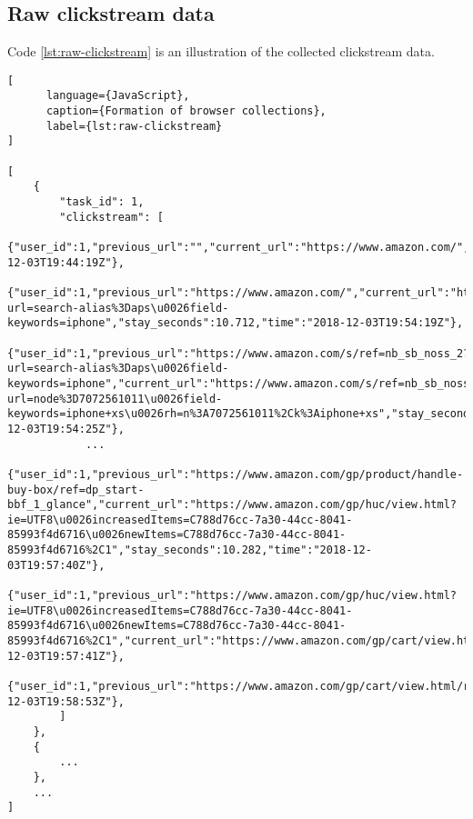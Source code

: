 \subsection{Raw clickstream data}

Code \ref{lst:raw-clickstream} is an illustration of the collected clickstream data.

\begin{lstlisting}[
      language={JavaScript},
      caption={Formation of browser collections},
      label={lst:raw-clickstream}
]

[
    {
        "task_id": 1,
        "clickstream": [
            {"user_id":1,"previous_url":"","current_url":"https://www.amazon.com/","stay_seconds":26.214,"time":"2018-12-03T19:44:19Z"},
            {"user_id":1,"previous_url":"https://www.amazon.com/","current_url":"https://www.amazon.com/s/ref=nb_sb_noss_2?url=search-alias%3Daps\u0026field-keywords=iphone","stay_seconds":10.712,"time":"2018-12-03T19:54:19Z"},
            {"user_id":1,"previous_url":"https://www.amazon.com/s/ref=nb_sb_noss_2?url=search-alias%3Daps\u0026field-keywords=iphone","current_url":"https://www.amazon.com/s/ref=nb_sb_noss?url=node%3D7072561011\u0026field-keywords=iphone+xs\u0026rh=n%3A7072561011%2Ck%3Aiphone+xs","stay_seconds":6.099,"time":"2018-12-03T19:54:25Z"},
            ...
            {"user_id":1,"previous_url":"https://www.amazon.com/gp/product/handle-buy-box/ref=dp_start-bbf_1_glance","current_url":"https://www.amazon.com/gp/huc/view.html?ie=UTF8\u0026increasedItems=C788d76cc-7a30-44cc-8041-85993f4d6716\u0026newItems=C788d76cc-7a30-44cc-8041-85993f4d6716%2C1","stay_seconds":10.282,"time":"2018-12-03T19:57:40Z"},
            {"user_id":1,"previous_url":"https://www.amazon.com/gp/huc/view.html?ie=UTF8\u0026increasedItems=C788d76cc-7a30-44cc-8041-85993f4d6716\u0026newItems=C788d76cc-7a30-44cc-8041-85993f4d6716%2C1","current_url":"https://www.amazon.com/gp/cart/view.html/ref=lh_cart_vc_btn","stay_seconds":1.886,"time":"2018-12-03T19:57:41Z"},
            {"user_id":1,"previous_url":"https://www.amazon.com/gp/cart/view.html/ref=lh_cart_vc_btn","current_url":"https://www.amazon.com/ap/signin","stay_seconds":71.552,"time":"2018-12-03T19:58:53Z"},
        ]
    },
    {
        ...
    },
    ...
]

\end{lstlisting}


\cleardoublepage